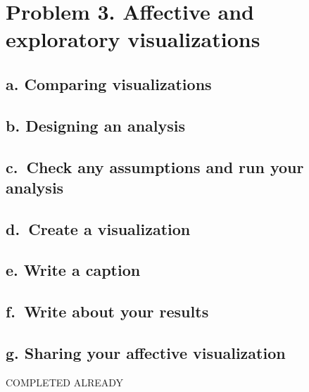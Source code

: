 \documentclass[
  letterpaper,
  DIV=11,
  numbers=noendperiod]{scrartcl}
\begin{document}
\section{Problem 3. Affective and exploratory
visualizations}\label{problem-3.-affective-and-exploratory-visualizations}

\subsection{a. Comparing
visualizations}\label{a.-comparing-visualizations}

\subsection{b. Designing an analysis}\label{b.-designing-an-analysis}

\subsection{c.~Check any assumptions and run your
analysis}\label{c.-check-any-assumptions-and-run-your-analysis}

\subsection{d.~Create a visualization}\label{d.-create-a-visualization}

\subsection{e. Write a caption}\label{e.-write-a-caption}

\subsection{f.~Write about your
results}\label{f.-write-about-your-results}

\subsection{g. Sharing your affective
visualization}\label{g.-sharing-your-affective-visualization}

COMPLETED ALREADY
\end{document}
